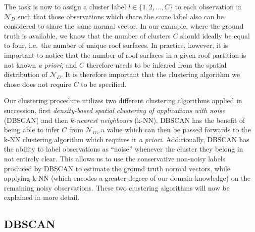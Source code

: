 The task is now to assign a cluster label $l \in \{1, 2, \ldots, C\}$ to each observation in $\mathcal{N}_D$ such that those observations which share the same label also can be considered to share the same normal vector.
In our example, where the ground truth is available, we know that the number of clusters $C$ should ideally be equal to four, i.e.\ the number of unique roof surfaces.
In practice, however, it is important to notice that the number of roof surfaces in a given roof partition is not known \textit{a priori}, and $C$ therefore needs to be inferred from the spatial distribution of $\mathcal{N}_{D}$.
It is therefore important that the clustering algorithm we chose does not require $C$ to be specified.

Our clustering procedure utilizes two different clustering algorithms applied in succession, first \textit{density-based spatial clustering of applications with noise} (DBSCAN) and then \textit{$k$-nearest neighbours} (k-NN).
DBSCAN has the benefit of being able to infer $C$ from $\mathcal{N}_D$, a value which can then be passed forwards to the k-NN clustering algorithm which requires it \textit{a priori}.
Additionally, DBSCAN has the ability to label observations as \enquote{noise} whenever the cluster they belong in not entirely clear.
This allows us to use the conservative non-noisy labels produced by DBSCAN to estimate the ground truth normal vectors, while applying k-NN (which encodes a greater degree of our domain knowledge) on the remaining noisy observations.
These two clustering algorithms will now be explained in more detail.

\subsection{DBSCAN}

